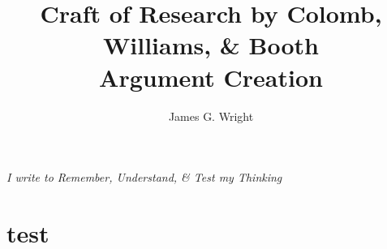 \documentclass[10pt, a4paper]{article}
\begin{document}
	\title{Craft of Research by Colomb, Williams, \& Booth\cite{booth2009craft}
		\\Argument Creation}
	\author{James G. Wright }
	\maketitle
	\begin{center}
		\emph{I write to Remember, Understand, \& Test my Thinking}
	\end{center}
	
	\newpage
	\section{test}
	
	
	
	
	
\end{document}
